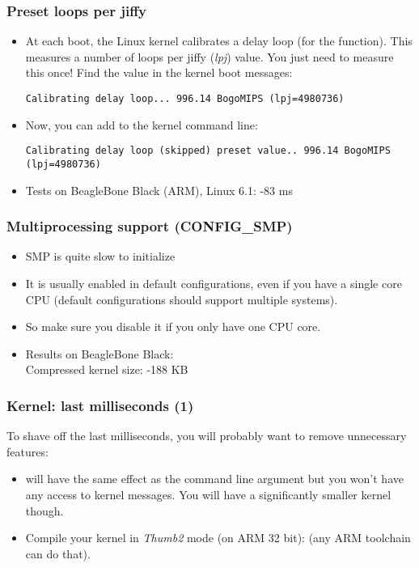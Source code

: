 \begin{frame}[fragile]
\frametitle{Preset loops per jiffy}
\begin{itemize}
        \item At each boot, the Linux kernel calibrates a delay loop (for
              the  function). This measures a number of loops per
              jiffy ({\em lpj}) value. You just need to measure this once! Find
              the  value in the kernel boot messages:
\begin{block}{}
\small
\begin{verbatim}
Calibrating delay loop... 996.14 BogoMIPS (lpj=4980736)
\end{verbatim}
\end{block}
        \item Now, you can add  to the kernel command
              line:
\begin{block}{}
\small
\begin{verbatim}
Calibrating delay loop (skipped) preset value.. 996.14 BogoMIPS (lpj=4980736)
\end{verbatim}
\end{block}
        \item Tests on BeagleBone Black (ARM), Linux 6.1: -83 ms
\end{itemize}
\end{frame}

\begin{frame}
  \frametitle{Multiprocessing support (CONFIG\_SMP)}
  \begin{itemize}
          \item SMP is quite slow to initialize
          \item It is usually enabled in default configurations, even if
                you have a single core CPU (default configurations
                should support multiple systems).
          \item So make sure you disable it if you only have one CPU
                core.
          \item Results on BeagleBone Black:\\
                Compressed kernel size: -188 KB
  \end{itemize}
\end{frame}


\begin{frame}
\frametitle{Kernel: last milliseconds (1)}
To shave off the last milliseconds, you will probably want to remove
unnecessary features:
\begin{itemize}
        \item {} will have the same effect as the
               command line argument but you won't have
	      any access to kernel messages. You will have a
              significantly smaller kernel though.
	\item Compile your kernel in {\em Thumb2} mode (on ARM 32 bit):
	       (any ARM toolchain can do
	      that).
\end{itemize}
\end{frame}

